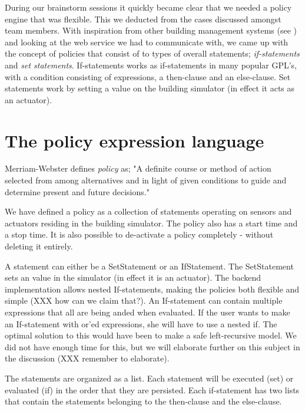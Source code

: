 During our brainstorm sessions it quickly became clear that we needed a policy engine that was flexible. This we deducted from the cases discussed amongst team members. With inspiration from other building management systems (see ) and looking at the web service we had to communicate with, we came up with the concept of policies that consist of to types of overall statements; \textit{if-statements} and \textit{set statements}. If-statements works as if-statements in many popular GPL's, with a condition consisting of expressions, a then-clause and an else-clause. Set statements work by setting a value on the building simulator (in effect it acts as an actuator).

\section{The policy expression language}
Merriam-Webster defines \textit{policy} as; "A definite course or method of action selected from among alternatives and in light of given conditions to guide and determine present and future decisions."

We have defined a policy as a collection of statements operating on sensors and actuators residing in the building simulator. The policy also has a start time and a stop time. It is also possible to de-activate a policy completely - without deleting it entirely.

A statement can either be a SetStatement or an IfStatement. The SetStatement sets an value in the simulator (in effect it is an actuator). The backend implementation allows nested If-statements, making the policies both flexible and simple (XXX how can we claim that?). An If-statement can contain multiple expressions that all are being anded when evaluated. If the user wants to make an If-statement with or'ed expressions, she will have to use a nested if. The optimal solution to this would have been to make a safe left-recursive model. We did not have enough time for this, but we will elaborate further on this subject in the discussion (XXX remember to elaborate). 

The statements are organized as a list. Each statement will be executed (set) or evaluated (if) in the order that they are persisted. Each if-statement has two lists that contain the statements belonging to the then-clause and the else-clause.

